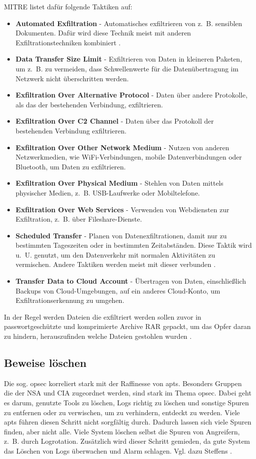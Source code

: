 \documentclass[conference]{IEEEtran}
\begin{document}
MITRE \cite{MITREExfiltration} listet dafür folgende Taktiken auf:
\begin{itemize}
    \item \textbf{Automated Exfiltration} - Automatisches exfiltrieren von z.~B. sensiblen Dokumenten. Dafür wird diese Technik meist mit anderen Exfiltrationstechniken kombiniert \cite{MITREAutomatedExfiltration}.
    \item \textbf{Data Transfer Size Limit} - Exfiltrieren von Daten in kleineren Paketen, um z.~B. zu vermeiden, dass Schwellenwerte für die Datenübertragung im Netzwerk nicht überschritten werden.
    \item \textbf{Exfiltration Over Alternative Protocol} - Daten über andere Protokolle, als das der bestehenden Verbindung, exfiltrieren.
    \item \textbf{Exfiltration Over C2 Channel} - Daten über das Protokoll der bestehenden Verbindung exfiltrieren.
    \item \textbf{Exfiltration Over Other Network Medium} - Nutzen von anderen Netzwerkmedien, wie WiFi-Verbindungen, mobile Datenverbindungen oder Bluetooth, um Daten zu exfiltrieren.
    \item \textbf{Exfiltration Over Physical Medium} - Stehlen von Daten mittels physischer Medien, z.~B. USB-Laufwerke oder Mobiltelefone.
    \item \textbf{Exfiltration Over Web Services} - Verwenden von Webdiensten zur Exfiltration, z.~B. über Fileshare-Dienste.
    \item \textbf{Scheduled Transfer} - Planen von Datenexfiltrationen, damit nur zu bestimmten Tageszeiten oder in bestimmten Zeitabständen. Diese Taktik wird u.~U. genutzt, um den Datenverkehr mit normalen Aktivitäten zu vermischen. Andere Taktiken werden meist mit dieser verbunden \cite{MITREScheduledTransfer}.
    \item \textbf{Transfer Data to Cloud Account} - Übertragen von Daten, einschließlich Backups von Cloud-Umgebungen, auf ein anderes Cloud-Konto, um Exfiltrationserkennung zu umgehen.
\end{itemize}

In der Regel werden Dateien die exfiltriert werden sollen zuvor in passwortgeschützte und komprimierte Archive RAR gepackt, um das Opfer daran zu hindern, herauszufinden welche Dateien gestohlen wurden \cite[S.~19]{Steffens2020}.

\subsection{Beweise löschen}
Die sog. \ac{opsec} korreliert stark mit der Raffinesse von \acp{apt}.
Besonders Gruppen die der NSA und CIA zugeordnet werden, sind stark im Thema \ac{opsec}.
Dabei geht es darum, genutzte Tools zu löschen, Logs richtig zu löschen und sonstige Spuren zu entfernen oder zu verwischen, um zu verhindern, entdeckt zu werden.
Viele \acp{apt} führen diesen Schritt nicht sorgfältig durch.
Dadurch lassen sich viele Spuren finden, aber nicht alle.
Viele System löschen selbst die Spuren von Angreifern, z.~B. durch Logrotation.
Zusätzlich wird dieser Schritt gemieden, da gute System das Löschen von Logs überwachen und Alarm schlagen.
Vgl. dazu Steffens \cite[S.~19f]{Steffens2020}.
\end{document}
